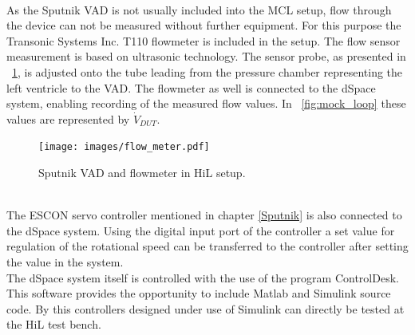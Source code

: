 \\As the Sputnik VAD is not usually included into the MCL setup, flow through the device can not be measured without further equipment. For this purpose the Transonic Systems Inc. T110 flowmeter is included in the setup. The flow sensor measurement is based on ultrasonic technology. The sensor probe, as presented in \figurename~\ref{fig:flow_meter_tube}, is adjusted onto the tube leading from the pressure chamber representing the left ventricle to the VAD. The flowmeter as well is connected to the dSpace system, enabling recording of the measured flow values. In \figurename~\ref{fig:mock_loop} these values are represented by $\dot{V}_{DUT}$.
\begin{figure}[ht]
  \centering
  \texttt{[image: images/flow\_meter.pdf]}
  \caption[Sputnik VAD and flowmeter in HiL setup]{Sputnik VAD and flowmeter in HiL setup.}
  \label{fig:flow_meter_tube}
\end{figure}
\\The ESCON servo controller mentioned in chapter \ref{Sputnik} is also connected to the dSpace system. Using the digital input port of the controller a set value for regulation of the rotational speed can be transferred to the controller after setting the value in the system.
\\The dSpace system itself is controlled with the use of the program ControlDesk. This software provides the opportunity to include Matlab and Simulink source code. By this controllers designed under use of Simulink can directly be tested at the HiL test bench.

